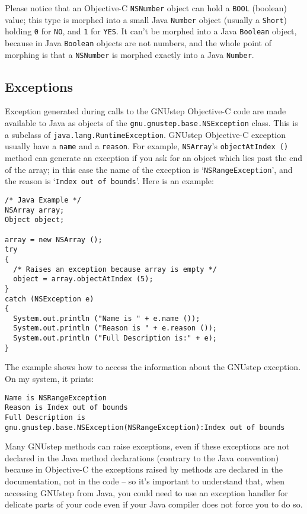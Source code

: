 Please notice that an Objective-C \texttt{NSNumber} object can hold a
\texttt{BOOL} (boolean) value; this type is morphed into a small Java
\texttt{Number} object (usually a \texttt{Short}) holding \texttt{0}
for \texttt{NO}, and \texttt{1} for \texttt{YES}.  It can't be morphed
into a Java \texttt{Boolean} object, because in Java \texttt{Boolean}
objects are not numbers, and the whole point of morphing is that a
\texttt{NSNumber} is morphed exactly into a Java \texttt{Number}.

\subsection{Exceptions}

Exception generated during calls to the GNUstep Objective-C code are
made available to Java as objects of the
\texttt{gnu.gnustep.base.NSException} class.  This is a subclass of
\texttt{java.lang.RuntimeException}.  GNUstep Objective-C exception
usually have a \texttt{name} and a \texttt{reason}.  For example,
\texttt{NSArray}'s \texttt{objectAtIndex ()} method can generate an
exception if you ask for an object which lies past the end of the
array; in this case the name of the exception is
`\texttt{NSRangeException}', and the reason is `\texttt{Index out of
bounds}'.  Here is an example:
\begin{verbatim}
/* Java Example */
NSArray array;
Object object;

array = new NSArray ();
try 
{
  /* Raises an exception because array is empty */
  object = array.objectAtIndex (5);
}
catch (NSException e)
{
  System.out.println ("Name is " + e.name ());
  System.out.println ("Reason is " + e.reason ());
  System.out.println ("Full Description is:" + e);
}
\end{verbatim}
The example shows how to access the information about the GNUstep 
exception.  On my system, it prints:
\begin{verbatim}
Name is NSRangeException
Reason is Index out of bounds
Full Description is gnu.gnustep.base.NSException(NSRangeException):Index out of bounds
\end{verbatim}

Many GNUstep methods can raise exceptions, even if these exceptions
are not declared in the Java method declarations (contrary to the Java
convention) because in Objective-C the exceptions raised by methods
are declared in the documentation, not in the code -- so it's
important to understand that, when accessing GNUstep from Java, you
could need to use an exception handler for delicate parts of your code
even if your Java compiler does not force you to do so.

